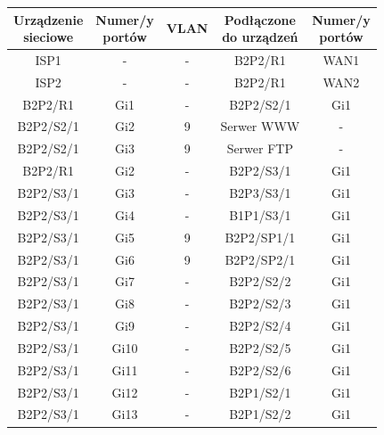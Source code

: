 \documentclass[a4paper,12pt]{extarticle}  %
\newcommand{\tabc}[1]{
	\textbf{
	\begin{tabular}{c}
		#1
	\end{tabular}
	}
}
\begin{document}
\begin{longtable}[c]{|c|c|c|c|c|}
	\hline
	\tabc{Urządzenie                                      \\sieciowe} & \tabc{Numer/y\\portów} & \textbf{VLAN} & \tabc{Podłączone\\ do urządzeń}        & \tabc{Numer/y\\ portów} \\ \hline
	\endfirsthead
	\endhead
	ISP1      & -       & - & B2P2/R1       & WAN1        \\ \hline %
	ISP2      & -       & - & B2P2/R1       & WAN2        \\ \hline %
	B2P2/R1   & Gi1     & - & B2P2/S2/1     & Gi1         \\ \hline %
	B2P2/S2/1 & Gi2     & 9 & Serwer WWW    & -           \\ \hline %
	B2P2/S2/1 & Gi3     & 9 & Serwer FTP    & -           \\ \hline %
	B2P2/R1   & Gi2     & - & B2P2/S3/1     & Gi1         \\ \hline %
	B2P2/S3/1 & Gi3     & - & B2P3/S3/1     & Gi1         \\ \hline %
	B2P2/S3/1 & Gi4     & - & B1P1/S3/1     & Gi1         \\ \hline %
	B2P2/S3/1 & Gi5     & 9 & B2P2/SP1/1    & Gi1         \\ \hline %
	B2P2/S3/1 & Gi6     & 9 & B2P2/SP2/1    & Gi1         \\ \hline %
	B2P2/S3/1 & Gi7     & - & B2P2/S2/2     & Gi1         \\ \hline %
	B2P2/S3/1 & Gi8     & - & B2P2/S2/3     & Gi1         \\ \hline %
	B2P2/S3/1 & Gi9     & - & B2P2/S2/4     & Gi1         \\ \hline %
	B2P2/S3/1 & Gi10    & - & B2P2/S2/5     & Gi1         \\ \hline %
	B2P2/S3/1 & Gi11    & - & B2P2/S2/6     & Gi1         \\ \hline %
	B2P2/S3/1 & Gi12    & - & B2P1/S2/1     & Gi1         \\ \hline %
	B2P2/S3/1 & Gi13    & - & B2P1/S2/2     & Gi1         \\ \hline %

\end{longtable}
\end{document}
